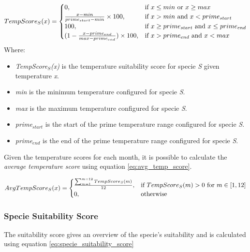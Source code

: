 \begin{equation}
\centering
TempScore_{S}(x) = 
\begin{cases}
    0, & \text{if } x \leq min \text{ or } x \geq max \\
    \frac{x - min}{prime_{start} - min} \times 100, & \text{if } x > min \text{ and } x < prime_{start} \\
    100, & \text{if } x \geq prime_{start} \text{ and } x \leq prime_{end} \\
    (1 - \frac{x - prime_{end}}{max-prime_{end}}) \times 100, & \text{if } x > prime_{end} \text{ and } x < max \\
\end{cases}
\label{eq:monthly_temp_score}
\end{equation}
Where:
\begin{itemize}
\item \textit{TempScore$_{S}$(x)} is the temperature suitability score for specie \textit{S} given temperature \textit{x}.
\item \textit{min} is the minimum temperature configured for specie \textit{S}.
\item \textit{max} is the maximum temperature configured for specie \textit{S}.
\item \textit{prime$_{start}$} is the start of the prime temperature range configured for specie \textit{S}.
\item \textit{prime$_{end}$} is the end of the prime temperature range configured for specie \textit{S}.
\end{itemize}

Given the temperature scores for each month, it is possible to calculate the \textit{average temperature score} using equation \ref{eq:avg_temp_score}.

\begin{equation}
\centering
AvgTempScore_{S}(x) =
\begin{cases}
	\frac{\sum_{m=1}^{m=12} TempScore_{S}(m)}{12}, & \text{if } TempScore_{S}(m) > 0 \text{ for } m \in [1,12] \\
    0,              & \text{otherwise}
\end{cases}
\label{eq:avg_temp_score}
\end{equation}

\subsubsection{Specie Suitability Score}

The suitability score gives an overview of the specie's suitability and is calculated using equation \ref{eq:specie_suitability_score}

